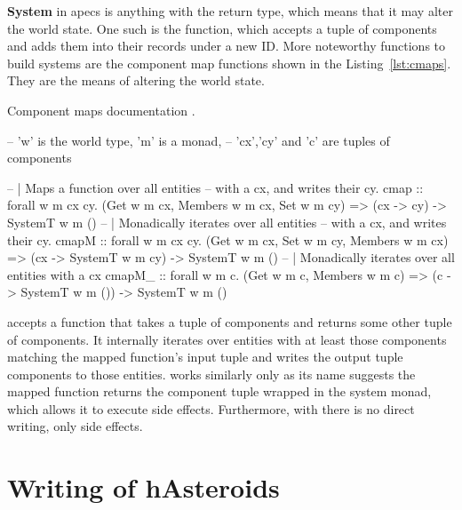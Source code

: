 \documentclass[
  digital, %
  color,   %
  table,   %
  oneside, %
  lof,     %
  lot,     %
]{fithesis3}
\begin{document}
\textbf{System} in apecs is anything with the  return type, which
means that it may alter the world state.
One such  is the  function, which
accepts a tuple of components and adds them into their records under a new ID.
More noteworthy functions to build systems are the component map functions
shown in the Listing~\ref{lst:cmaps}. They are the means of altering the world state.
\begin{listing}[H]
\caption{Component maps documentation \cite{apecsdocs}.}
\begin{haskell}
-- 'w' is the world type, 'm' is a monad,
-- 'cx','cy' and 'c' are tuples of components

-- | Maps a function over all entities
--   with a cx, and writes their cy.
cmap :: forall w m cx cy.
    (Get w m cx, Members w m cx, Set w m cy) =>
    (cx -> cy) -> SystemT w m ()
-- | Monadically iterates over all entities
--   with a cx, and writes their cy.
cmapM :: forall w m cx cy.
    (Get w m cx, Set w m cy, Members w m cx) =>
    (cx -> SystemT w m cy) -> SystemT w m ()
-- | Monadically iterates over all entities with a cx
cmapM_ :: forall w m c.
    (Get w m c, Members w m c) =>
    (c -> SystemT w m ()) -> SystemT w m ()
\end{haskell}
\label{lst:cmaps}
\end{listing}
 accepts a function that takes a tuple of components
and returns some other tuple of components. It internally iterates
over entities with at least those components matching the mapped
function's input tuple and writes the output tuple components
to those entities.  works similarly
only as its name suggests the mapped function returns the component
tuple wrapped in the system monad, which allows it to execute side effects.
Furthermore, with  there is no direct writing, only side effects.



\section{Writing of hAsteroids}
\end{document}
